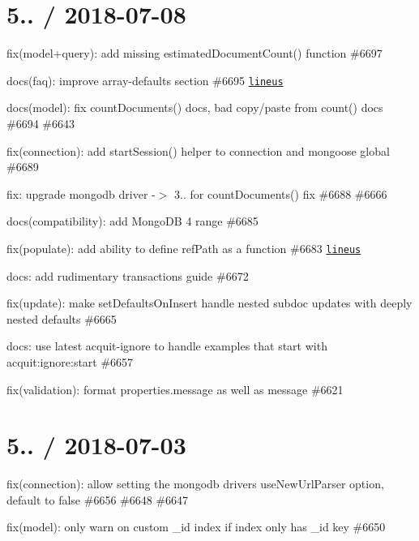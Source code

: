 \section*{5.. / 2018-\/07-\/08 }


\begin{DoxyItemize}
\item fix(model+query)\+: add missing estimated\+Document\+Count() function \#6697
\item docs(faq)\+: improve array-\/defaults section \#6695 \href{https://github.com/lineus}{\tt lineus}
\item docs(model)\+: fix count\+Documents() docs, bad copy/paste from count() docs \#6694 \#6643
\item fix(connection)\+: add {\ttfamily start\+Session()} helper to connection and mongoose global \#6689
\item fix\+: upgrade mongodb driver -\/$>$ 3.. for count\+Documents() fix \#6688 \#6666
\item docs(compatibility)\+: add Mongo\+DB 4 range \#6685
\item fix(populate)\+: add ability to define ref\+Path as a function \#6683 \href{https://github.com/lineus}{\tt lineus}
\item docs\+: add rudimentary transactions guide \#6672
\item fix(update)\+: make set\+Defaults\+On\+Insert handle nested subdoc updates with deeply nested defaults \#6665
\item docs\+: use latest acquit-\/ignore to handle examples that start with acquit\+:ignore\+:start \#6657
\item fix(validation)\+: format {\ttfamily properties.\+message} as well as {\ttfamily message} \#6621
\end{DoxyItemize}

\section*{5.. / 2018-\/07-\/03 }


\begin{DoxyItemize}
\item fix(connection)\+: allow setting the mongodb driver\textquotesingle{}s use\+New\+Url\+Parser option, default to false \#6656 \#6648 \#6647
\item fix(model)\+: only warn on custom \+\_\+id index if index only has \+\_\+id key \#6650
\end{DoxyItemize}

